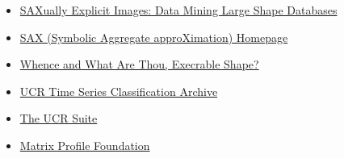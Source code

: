 \begin{frame}
\begin{itemize}
        \item \href{https://www.youtube.com/watch?v=vzPgHF7gcUQ}{SAXually Explicit Images: Data Mining Large Shape Databases}
        \item \href{https://www.cs.ucr.edu/~eamonn/SAX.htm}{SAX (Symbolic Aggregate approXimation) Homepage}
        \item \href{https://www.cs.ucr.edu/~eamonn/shape/shape.htm}{Whence and What Are Thou, Execrable Shape?}
        \item \href{https://www.cs.ucr.edu/~eamonn/time_series_data_2018/}{UCR Time Series Classification Archive}
        \item \href{https://www.cs.ucr.edu/~eamonn/UCRsuite.html}{The UCR Suite}
        \item \href{https://matrixprofile.org/}{Matrix Profile Foundation}
\end{itemize}
\end{frame}
